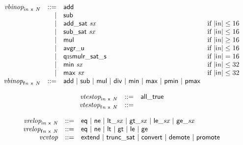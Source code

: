 $$
\begin{array}{@{}lrrl@{}l@{}}
& {{\mathit{vbinop}}}_{{\mathsf{i}}{{\mathit{n}}}~\mathsf{x}~{\mathit{N}}} &::=& \mathsf{add} \\ &&|&
\mathsf{sub} \\ &&|&
\mathsf{add\_sat}~{\mathit{sx}} &\quad
  \mbox{if}~{|{\mathsf{i}}{{\mathit{n}}}|} \leq 16 \\ &&|&
\mathsf{sub\_sat}~{\mathit{sx}} &\quad
  \mbox{if}~{|{\mathsf{i}}{{\mathit{n}}}|} \leq 16 \\ &&|&
\mathsf{mul} &\quad
  \mbox{if}~{|{\mathsf{i}}{{\mathit{n}}}|} \geq 16 \\ &&|&
\mathsf{avgr\_u} &\quad
  \mbox{if}~{|{\mathsf{i}}{{\mathit{n}}}|} \leq 16 \\ &&|&
\mathsf{q{\scriptstyle15}mulr\_sat\_s} &\quad
  \mbox{if}~{|{\mathsf{i}}{{\mathit{n}}}|} = 16 \\ &&|&
\mathsf{min}~{\mathit{sx}} &\quad
  \mbox{if}~{|{\mathsf{i}}{{\mathit{n}}}|} \leq 32 \\ &&|&
\mathsf{max}~{\mathit{sx}} &\quad
  \mbox{if}~{|{\mathsf{i}}{{\mathit{n}}}|} \leq 32 \\
& {{\mathit{vbinop}}}_{{\mathsf{f}}{{\mathit{n}}}~\mathsf{x}~{\mathit{N}}} &::=& \mathsf{add} ~|~ \mathsf{sub} ~|~ \mathsf{mul} ~|~ \mathsf{div} ~|~ \mathsf{min} ~|~ \mathsf{max} ~|~ \mathsf{pmin} ~|~ \mathsf{pmax} \\
\end{array}
$$

$$
\begin{array}{@{}lrrl@{}l@{}}
& {{\mathit{vtestop}}}_{{\mathsf{i}}{{\mathit{n}}}~\mathsf{x}~{\mathit{N}}} &::=& \mathsf{all\_true} \\
& {{\mathit{vtestop}}}_{{\mathsf{f}}{{\mathit{n}}}~\mathsf{x}~{\mathit{N}}} &::=&  \\
\end{array}
$$

$$
\begin{array}{@{}lrrl@{}l@{}}
& {{\mathit{vrelop}}}_{{\mathsf{i}}{{\mathit{n}}}~\mathsf{x}~{\mathit{N}}} &::=& \mathsf{eq} ~|~ \mathsf{ne} ~|~ {\mathsf{lt\_}}{{\mathit{sx}}} ~|~ {\mathsf{gt\_}}{{\mathit{sx}}} ~|~ {\mathsf{le\_}}{{\mathit{sx}}} ~|~ {\mathsf{ge\_}}{{\mathit{sx}}} \\
& {{\mathit{vrelop}}}_{{\mathsf{f}}{{\mathit{n}}}~\mathsf{x}~{\mathit{N}}} &::=& \mathsf{eq} ~|~ \mathsf{ne} ~|~ \mathsf{lt} ~|~ \mathsf{gt} ~|~ \mathsf{le} ~|~ \mathsf{ge} \\
& {\mathit{vcvtop}} &::=& \mathsf{extend} ~|~ \mathsf{trunc\_sat} ~|~ \mathsf{convert} ~|~ \mathsf{demote} ~|~ \mathsf{promote} \\
\end{array}
$$

